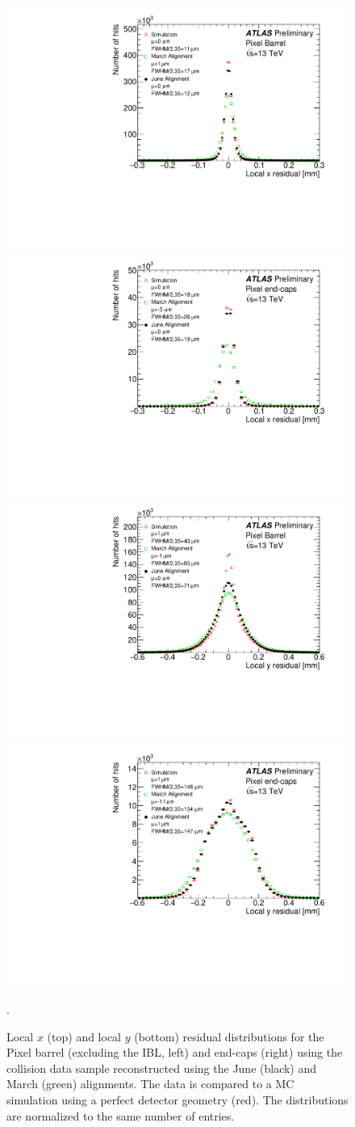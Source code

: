 \begin{figure}[htbp]
  \includegraphics[width=.48\textwidth]{figs/alignment/align2015/OLDPIXX}
  \includegraphics[width=.48\textwidth]{figs/alignment/align2015/PIXECX}\\
  \includegraphics[width=.48\textwidth]{figs/alignment/align2015/OLDPIXY}
  \includegraphics[width=.48\textwidth]{figs/alignment/align2015/PIXECY}
  \caption{Local $x$ (top) and local $y$ (bottom) residual distributions for the Pixel barrel (excluding the IBL, left) and end-caps (right) using the  collision data sample reconstructed using the June (black) and March (green) alignments.  The data is compared to a MC simulation using a perfect detector geometry (red).  The distributions are normalized to the same number of entries.}
  \label{fig:align_2015_results_pix}.
\end{figure}

